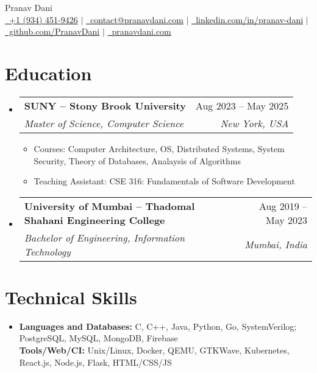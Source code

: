 \documentclass[letterpaper,11pt]{article}
\makeatletter
\newcommand{\resumeItem}[1]{
  \item\small{
    {#1 \vspace{-2pt}}
  }
}
\newcommand{\resumeSubheading}[4]{
  \vspace{-2pt}\item
    \begin{tabular*}{1.0\textwidth}[t]{l@{\extracolsep{\fill}}r}
      \vspace{-2pt}\textbf{#1} & \small #2 \\
      \textit{\small#3} & \textit{\small #4} \\
    \end{tabular*}\vspace{-7pt}
}
\newcommand{\resumeSubHeadingListStart}{\begin{itemize}[leftmargin=0.0in, label={}]}
\newcommand{\resumeSubHeadingListEnd}{\end{itemize}}
\newcommand{\resumeItemListStart}{\begin{itemize}}
\newcommand{\resumeItemListEnd}{\end{itemize}\vspace{-5pt}}
\makeatother
\begin{document}
\begin{center}
  {\huge Pranav Dani} \\ \vspace{4pt}
  \small
  \href{tel:+19344529426}{\raisebox{-0.2\height}\ +1 (934) 451-9426} $|$
  \href{mailto:contact@pranavdani.com}{\raisebox{-0.2\height}\    contact@pranavdani.com} $|$
  \href{https://linkedin.com/in/pranav-dani}{\raisebox{-0.2\height}\  linkedin.com/in/pranav-dani} $|$
  \href{https://github.com/PranavDani}{\raisebox{-0.2\height}\  github.com/PranavDani} $|$
  \href{https://pranavdani.com}{\raisebox{-0.1\height}\ pranavdani.com}
  \vspace{-8pt}
\end{center}


\section{Education}
\resumeSubHeadingListStart
\resumeSubheading
{SUNY -- Stony Brook University}{Aug 2023 -- May 2025}
{Master of Science, Computer Science}{New York, USA}
\resumeItemListStart
\resumeItem{Courses: Computer Architecture, OS, Distributed Systems, System Security, Theory of Databases, Analaysis of Algorithms}
\resumeItem{Teaching Assistant: CSE 316: Fundamentals of Software Development}
\resumeItemListEnd
\vspace{-3pt}

\resumeSubheading
{University of Mumbai -- Thadomal Shahani Engineering College}{Aug 2019 -- May 2023}
{Bachelor of Engineering, Information Technology}{Mumbai, India}
\resumeSubHeadingListEnd


\section{Technical Skills}
\begin{itemize}[leftmargin=0.2in, label={}]
  \item \textbf{Languages and Databases:} C, C++, Java, Python, Go, SystemVerilog; PostgreSQL, MySQL, MongoDB, Firebase\\
        \textbf{Tools/Web/CI:} Unix/Linux, Docker, QEMU, GTKWave, Kubernetes,  React.js, Node.js, Flask, HTML/CSS/JS
\end{itemize}
\vspace{-16pt}
\end{document}
